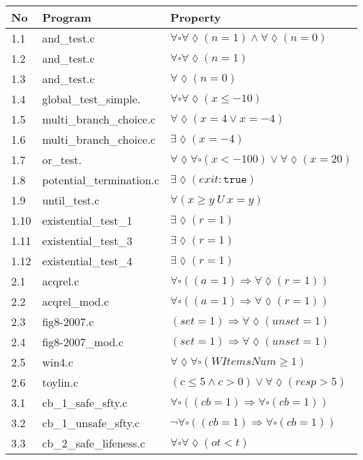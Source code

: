 \documentclass[11pt,a4paper,titlepage]{article}
\theoremstyle{definition}
\begin{document}
\begin{table}
\scriptsize\begin{tabular}{l l l}
    \textbf{No} & \textbf{Program} & \textbf{Property} \\
\hline
1.1 & and\_test.c & $\forall\square\forall\lozenge(n = 1) \land \forall\lozenge(n = 0)$ \\
1.2 & and\_test.c & $\forall\square\forall\lozenge(n = 1)$ \\
1.3 & and\_test.c & $\forall\lozenge(n = 0)$ \\
1.4 & global\_test\_simple. & $\forall\square\forall\lozenge(x \leq -10)$ \\
1.5 & multi\_branch\_choice.c & $\forall\lozenge(x = 4 \lor x = -4)$ \\
1.6 & multi\_branch\_choice.c & $\exists\lozenge(x = -4)$ \\
1.7 & or\_test. & $\forall\lozenge\forall\square(x < -100) \lor \forall\lozenge(x = 20)$  \\
1.8 & potential\_termination.c & $\exists\lozenge(exit: \mathtt{true})$ \\
1.9 & until\_test.c & $\forall(x \geq y \ U \ x = y)$ \\
1.10 & existential\_test\_1 & $\exists\lozenge(r = 1)$ \\
1.11 & existential\_test\_3 & $\exists\lozenge(r = 1)$ \\
1.12 & existential\_test\_4 & $\exists\lozenge(r = 1)$ \\
\hline
2.1 & acqrel.c & $\forall\square((a = 1) \Rightarrow \forall\lozenge(r = 1))$ \\
2.2 & acqrel\_mod.c & $\forall\square((a = 1) \Rightarrow \forall\lozenge(r = 1))$ \\
2.3 & fig8-2007.c & $(set = 1) \Rightarrow \forall\lozenge(unset = 1)$ \\
2.4 & fig8-2007\_mod.c & $(set = 1) \Rightarrow \forall\lozenge(unset = 1)$ \\
2.5 & win4.c & $\forall\lozenge\forall\square(WItemsNum \geq 1)$ \\
2.6 & toylin.c & $(c \leq 5 \land c > 0) \lor \forall\lozenge(resp > 5)$ \\
\hline
3.1 & cb\_1\_safe\_sfty.c & $\forall\square((cb = 1) \Rightarrow \forall\square(cb = 1))$ \\
3.2 & cb\_1\_unsafe\_sfty.c & $\neg \forall\square((cb = 1) \Rightarrow \forall\square(cb = 1))$ \\
3.3 & cb\_2\_safe\_lifeness.c & $\forall\square\forall\lozenge(ot < t)$ \\

\end{tabular}
\end{table}
\end{document}
